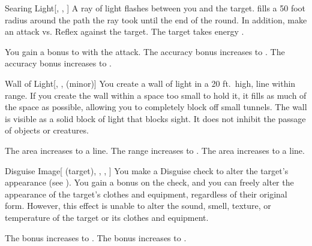 \lowercase{\hypertarget{spell:Searing Light}{}}\label{spell:Searing Light}
\begin{freeability}[Rank 1]{\hypertarget{spell:Searing Light}{Searing Light}}[, , ]
A ray of light flashes between you and the target.
 fills a 50 foot radius around the path the ray took until the end of the round.
In addition, make an attack vs. Reflex against the target.
\hit The target takes energy .

\rankline
{} You gain a  bonus to  with the attack.
 The accuracy bonus increases to .
 The accuracy bonus increases to .
\end{freeability}
\vspace{0.25em}



\lowercase{\hypertarget{spell:Wall of Light}{}}\label{spell:Wall of Light}
\begin{freeability}[Rank 1]{\hypertarget{spell:Wall of Light}{Wall of Light}}[, ,  (minor)]
\targetrule
You create a wall of light in a 20 ft.\ high, \areamed line within \rngmed range.
If you create the wall within a space too small to hold it, it fills as much of the space as possible, allowing you to completely block off small tunnels.
The wall is visible as a solid block of light that blocks sight.
It does not inhibit the passage of objects or creatures.

\rankline
{} The area increases to a \arealarge line.
 The range increases to \rnglong.
 The area increases to a \areahuge line.
\end{freeability}
\vspace{0.25em}



\lowercase{\hypertarget{spell:Disguise Image}{}}\label{spell:Disguise Image}
\begin{attuneability}[Rank 3]{\hypertarget{spell:Disguise Image}{Disguise Image}}[ (target), , , ]
You make a Disguise check to alter the target's appearance (see ).
You gain a  bonus on the check, and you can freely alter the appearance of the target's clothes and equipment, regardless of their original form.
However, this effect is unable to alter the sound, smell, texture, or temperature of the target or its clothes and equipment.

\rankline
{} The bonus increases to .
 The bonus increases to .
\end{attuneability}
\vspace{0.25em}



